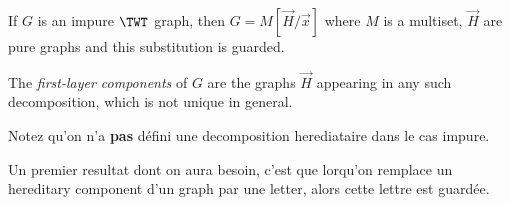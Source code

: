 
 
\begin{proposition}
If $G$ is an impure $\TWT$ graph, then $G=M[\vec{H}/\vec{x}]$ where $M$ is a multiset, $\vec{H}$ are pure graphs and this substitution is guarded. 

 The \emph{first-layer components} of $G$ are the graphs $\vec{H}$ appearing in any such decomposition, which is not unique in general. 
\end{proposition}
\begin{remark} Notez qu'on n'a \textbf{pas} défini une decomposition herediataire dans le cas impure. 
\end{remark}
Un premier resultat dont on aura besoin, c'est que lorqu'on remplace un hereditary component d'un graph par une letter, alors cette lettre est guardée.

